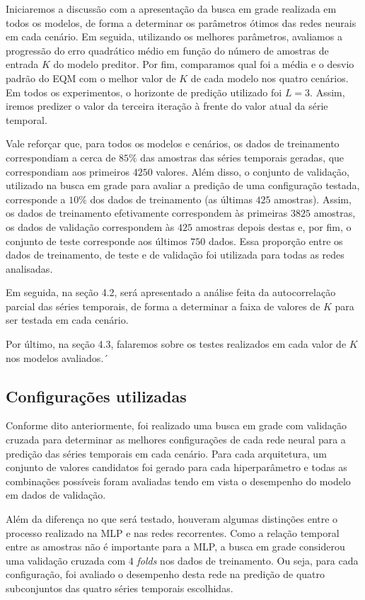 \documentclass[a4paper, 12pt]{article}
\begin{document}
Iniciaremos a discussão com a apresentação da busca em grade realizada em todos os modelos, de forma a determinar os parâmetros ótimos das redes neurais em cada cenário. Em seguida, utilizando os melhores parâmetros, avaliamos a progressão do erro quadrático médio em função do número de amostras de entrada $K$ do modelo preditor. Por fim, comparamos qual foi a média e o desvio padrão do EQM com o melhor valor de $K$ de cada modelo nos quatro cenários. Em todos os experimentos, o horizonte de predição utilizado foi $L=3$. Assim, iremos predizer o valor da terceira iteração à frente do valor atual da série temporal.

Vale reforçar que, para todos os modelos e cenários, os dados de treinamento correspondiam a cerca de $85\%$ das amostras das séries temporais geradas, que correspondiam aos primeiros $4250$ valores. Além disso, o conjunto de validação, utilizado na busca em grade para avaliar a predição de uma configuração testada, corresponde a $10\%$ dos dados de treinamento (as últimas $425$ amostras). Assim, os dados de treinamento efetivamente correspondem às primeiras $3825$ amostras, os dados de validação correspondem às $425$ amostras depois destas e, por fim, o conjunto de teste corresponde aos últimos $750$ dados. Essa proporção entre os dados de treinamento, de teste e de validação foi utilizada para todas as redes analisadas.

Em seguida, na seção 4.2, será apresentado a análise feita da autocorrelação parcial das séries temporais, de forma a determinar a faixa de valores de $K$ para ser testada em cada cenário.

Por último, na seção 4.3, falaremos sobre os testes realizados em cada valor de $K$ nos modelos avaliados.´

\subsection{Configurações utilizadas}

Conforme dito anteriormente, foi realizado uma busca em grade com validação cruzada para determinar as melhores configurações de cada rede neural para a predição das séries temporais em cada cenário. Para cada arquitetura, um conjunto de valores candidatos foi gerado para cada hiperparâmetro e todas as combinações possíveis foram avaliadas tendo em vista o desempenho do modelo em dados de validação.

Além da diferença no que será testado, houveram algumas distinções entre o processo realizado na MLP e nas redes recorrentes. Como a relação temporal entre as amostras não é importante para a MLP, a busca em grade considerou uma validação cruzada com $4$ \textit{folds} nos dados de treinamento. Ou seja, para cada configuração, foi avaliado o desempenho desta rede na predição de quatro subconjuntos das quatro séries temporais escolhidas.
\end{document}
